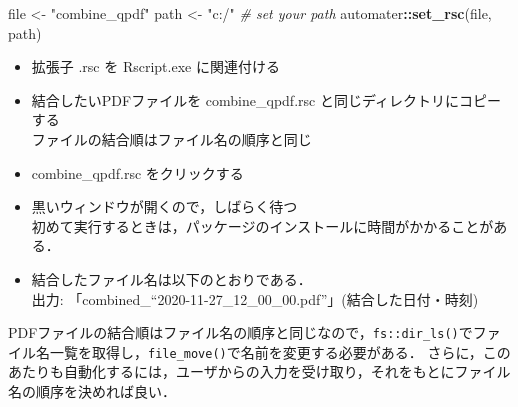 \documentclass[
]{article}
\newenvironment{Shaded}{\begin{snugshade}}{\end{snugshade}}
\newcommand{\CommentTok}[1]{\textcolor[rgb]{0.56,0.35,0.01}{\textit{#1}}}
\newcommand{\FunctionTok}[1]{\textcolor[rgb]{0.13,0.29,0.53}{\textbf{#1}}}
\newcommand{\NormalTok}[1]{#1}
\newcommand{\OtherTok}[1]{\textcolor[rgb]{0.56,0.35,0.01}{#1}}
\newcommand{\SpecialCharTok}[1]{\textcolor[rgb]{0.81,0.36,0.00}{\textbf{#1}}}
\newcommand{\StringTok}[1]{\textcolor[rgb]{0.31,0.60,0.02}{#1}}
\providecommand{\tightlist}{%
  \setlength{\itemsep}{0pt}\setlength{\parskip}{0pt}}
\begin{document}
\begin{Shaded}
\begin{Highlighting}[]
\NormalTok{file }\OtherTok{\textless{}{-}} \StringTok{"combine\_qpdf"}
\NormalTok{path }\OtherTok{\textless{}{-}} \StringTok{"c:/"} \CommentTok{\# set your path}
\NormalTok{automater}\SpecialCharTok{::}\FunctionTok{set\_rsc}\NormalTok{(file, path)}
\end{Highlighting}
\end{Shaded}

\begin{itemize}
\tightlist
\item
  拡張子 .rsc を Rscript.exe に関連付ける\\
\item
  結合したいPDFファイルを combine\_qpdf.rsc と同じディレクトリにコピーする\\
  ファイルの結合順はファイル名の順序と同じ\\
\item
  combine\_qpdf.rsc をクリックする\\
\item
  黒いウィンドウが開くので，しばらく待つ\\
  初めて実行するときは，パッケージのインストールに時間がかかることがある．\\
\item
  結合したファイル名は以下のとおりである．\\
  出力: 「combined\_``2020-11-27\_12\_00\_00.pdf''」(結合した日付・時刻)
\end{itemize}

PDFファイルの結合順はファイル名の順序と同じなので，\texttt{fs::dir\_ls()}でファイル名一覧を取得し，\texttt{file\_move()}で名前を変更する必要がある．
さらに，このあたりも自動化するには，ユーザからの入力を受け取り，それをもとにファイル名の順序を決めれば良い．
\end{document}
